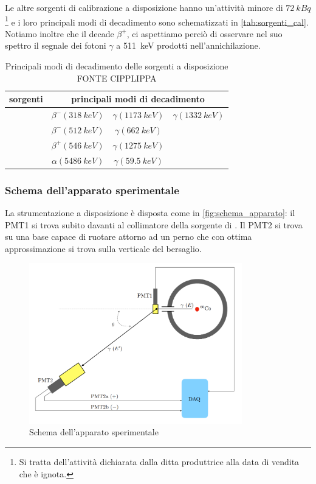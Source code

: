Le altre sorgenti di calibrazione a disposizione hanno un'attività minore di $\SI{72}{kBq}$\footnote{Si tratta dell'attività dichiarata dalla ditta produttrice alla data di vendita che è ignota.} e i loro principali modi di decadimento sono schematizzati in \autoref{tab:sorgenti_cal}. Notiamo inoltre che il \na\; decade $\beta^+$, ci aspettiamo perciò di osservare nel suo spettro il segnale dei fotoni $\gamma$ a \SI{511}{keV} prodotti nell'annichilazione.

\begin{table}[h]
	\centering
	\begin{tabular}{cccc}
		\toprule
		sorgenti & \multicolumn{3}{c}{principali modi di decadimento} \\
		\midrule
		\co & $\beta^{-} (\SI{318}{keV})$ & $\gamma (\SI{1173}{keV})$ & $\gamma (\SI{1332}{keV})$  \\
		\cs & $\beta^{-} (\SI{512}{keV})$ & $\gamma (\SI{662}{keV})$ \\
		\na & $\beta^{+} (\SI{546}{keV})$ & $\gamma (\SI{1275}{keV})$ \\
		\am & $\alpha (\SI{5486}{keV})$ & $\gamma (\SI{59.5}{keV})$ \\
		\bottomrule
	\end{tabular}
	\caption{\label{tab:sorgenti_cal} Principali modi di decadimento delle sorgenti a disposizione FONTE CIPPLIPPA}
\end{table} 

\subsubsection{Schema dell'apparato sperimentale}
La strumentazione a disposizione è disposta come in \autoref{fig:schema_apparato}: il PMT1 si trova subito davanti al collimatore della sorgente di \co. Il PMT2 si trova su una base capace di ruotare attorno ad un perno che con ottima approssimazione si trova sulla verticale del bersaglio.
 \begin{figure}[h]
	\centering
	\includegraphics[width=25em]{schema_apparato}
	\caption{\label{fig:schema_apparato}Schema dell'apparato sperimentale}
\end{figure}

